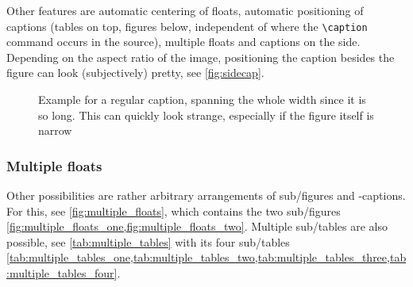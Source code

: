 \begin{description}
          Other features are automatic centering of floats, automatic positioning
          of captions (tables on top, figures below, independent of where the
          \verb|\caption| command occurs in the source), multiple floats and
          captions on the side.
          Depending on the aspect ratio of the image, positioning the caption besides
          the figure can look (subjectively) pretty, see \cref{fig:sidecap}.
\end{description}

\begin{figure}\ContinuedFloat*%
    \caption{%
        Example for a regular caption,
        spanning the whole width since it is so long.
        This can quickly look strange, especially if the figure itself is narrow%
    }%
    \label{fig:wide_caption}%
\end{figure}

\begin{figure}\ContinuedFloat
\end{figure}

\subsubsection{Multiple floats}

Other possibilities are rather arbitrary arrangements of sub\-/figures and -captions.
For this, see \cref{fig:multiple_floats}, which contains the two sub\-/figures
\cref{fig:multiple_floats_one,fig:multiple_floats_two}.
Multiple sub\-/tables are also possible, see \cref{tab:multiple_tables} with its four
sub\-/tables
\cref{tab:multiple_tables_one,tab:multiple_tables_two,tab:multiple_tables_three,tab:multiple_tables_four}.


